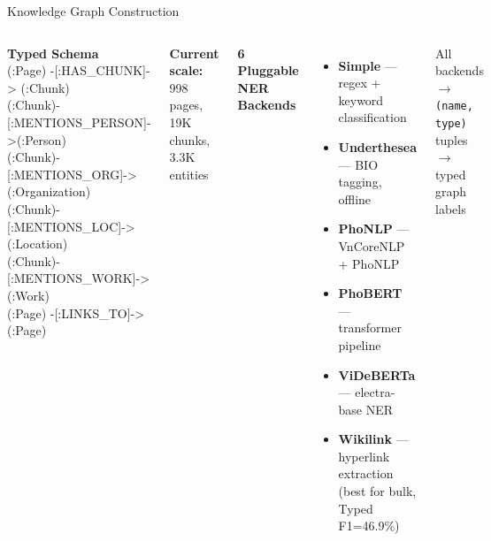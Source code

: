 \documentclass[aspectratio=169]{beamer}
\begin{document}
\begin{frame}{Knowledge Graph Construction}
\begin{columns}[T]
\textbf{Typed Schema}\\[4pt]
{\small\ttfamily
(:Page) -[:HAS\_CHUNK]-> (:Chunk)\\
(:Chunk)-[:MENTIONS\_PERSON]->(:Person)\\
(:Chunk)-[:MENTIONS\_ORG]->(:Organization)\\
(:Chunk)-[:MENTIONS\_LOC]->(:Location)\\
(:Chunk)-[:MENTIONS\_WORK]->(:Work)\\
(:Page) -[:LINKS\_TO]-> (:Page)
}
\vspace{0.5em}

\textbf{Current scale:} 998 pages, 19K chunks, 3.3K entities

\textbf{6 Pluggable NER Backends}
\begin{itemize}
  \item \textbf{Simple} --- regex + keyword classification
  \item \textbf{Underthesea} --- BIO tagging, offline
  \item \textbf{PhoNLP} --- VnCoreNLP + PhoNLP
  \item \textbf{PhoBERT} --- transformer pipeline
  \item \textbf{ViDeBERTa} --- electra-base NER
  \item \textbf{Wikilink} --- hyperlink extraction (best for bulk, Typed F1=46.9\%)
\end{itemize}
\vspace{0.3em}
All backends $\rightarrow$ \texttt{(name, type)} tuples $\rightarrow$ typed graph labels
\end{columns}
\end{frame}
\end{document}
